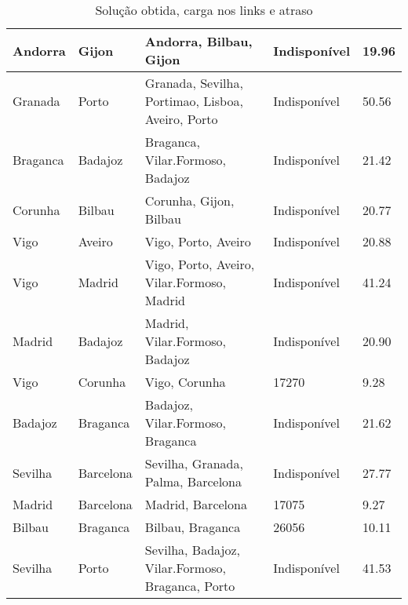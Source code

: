 \begin{table}[!htb]
{\begin{tabular}{|l|l|l|l|l|}
Andorra & Gijon & Andorra, Bilbau, Gijon & Indisponível & 19.96 \\ \hline
Granada & Porto & Granada, Sevilha, Portimao, Lisboa, Aveiro, Porto & Indisponível & 50.56 \\ \hline
Braganca & Badajoz & Braganca, Vilar.Formoso, Badajoz & Indisponível & 21.42 \\ \hline
Corunha & Bilbau & Corunha, Gijon, Bilbau & Indisponível & 20.77 \\ \hline
Vigo & Aveiro & Vigo, Porto, Aveiro & Indisponível & 20.88 \\ \hline
Vigo & Madrid & Vigo, Porto, Aveiro, Vilar.Formoso, Madrid & Indisponível & 41.24 \\ \hline
Madrid & Badajoz & Madrid, Vilar.Formoso, Badajoz & Indisponível & 20.90 \\ \hline
Vigo & Corunha & Vigo, Corunha & 17270 & 9.28 \\ \hline
Badajoz & Braganca & Badajoz, Vilar.Formoso, Braganca & Indisponível & 21.62 \\ \hline
Sevilha & Barcelona & Sevilha, Granada, Palma, Barcelona & Indisponível & 27.77 \\ \hline
Madrid & Barcelona & Madrid, Barcelona & 17075 & 9.27 \\ \hline
Bilbau & Braganca & Bilbau, Braganca & 26056 & 10.11 \\ \hline
Sevilha & Porto & Sevilha, Badajoz, Vilar.Formoso, Braganca, Porto & Indisponível & 41.53 \\ \hline
\end{tabular}}
\caption[]{Solução obtida, carga nos links e atraso}
\end{table}

